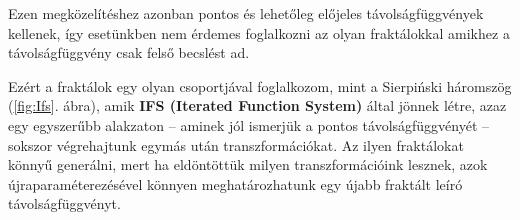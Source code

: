 Ezen megközelítéshez azonban pontos és lehetőleg előjeles távolságfüggvények kellenek, így esetünkben nem érdemes foglalkozni az olyan fraktálokkal amikhez a távolságfüggvény csak felső becslést ad. 

Ezért a fraktálok egy olyan csoportjával foglalkozom, mint a Sierpiński háromszög (\ref{fig:Ifs}. ábra), amik \textbf{IFS (Iterated Function System)}  által jönnek létre, azaz egy egyszerűbb alakzaton -- aminek jól ismerjük a pontos távolságfüggvényét -- sokszor végrehajtunk egymás után transzformációkat. Az ilyen fraktálokat könnyű generálni, mert ha eldöntöttük milyen transzformációink lesznek, azok újraparaméterezésével könnyen meghatározhatunk egy újabb fraktált leíró távolságfüggvényt.
